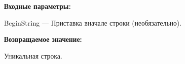\textbf{Входные параметры:}

BeginString --- Приставка вначале строки (необязательно).

\textbf{Возвращаемое значение:}

Уникальная строка.